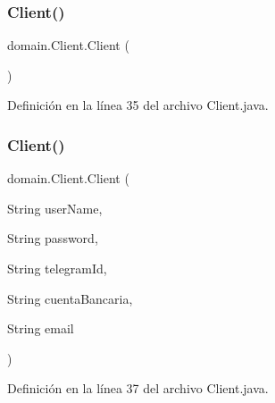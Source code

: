 \subsubsection{\texorpdfstring{Client()}{Client()}\hspace{0.1cm}{\footnotesize\ttfamily [1/2]}}
{\footnotesize\ttfamily domain.\+Client.\+Client (\begin{DoxyParamCaption}{ }\end{DoxyParamCaption})}



Definición en la línea 35 del archivo Client.\+java.


\begin{DoxyCode}{0}

\end{DoxyCode}
\mbox{\label{classdomain_1_1_client_ae7bf8adbac66187df5b6a5dfd22fba86}} 
\subsubsection{\texorpdfstring{Client()}{Client()}\hspace{0.1cm}{\footnotesize\ttfamily [2/2]}}
{\footnotesize\ttfamily domain.\+Client.\+Client (\begin{DoxyParamCaption}\item[{String}]{user\+Name,  }\item[{String}]{password,  }\item[{String}]{telegram\+Id,  }\item[{String}]{cuenta\+Bancaria,  }\item[{String}]{email }\end{DoxyParamCaption})}



Definición en la línea 37 del archivo Client.\+java.


